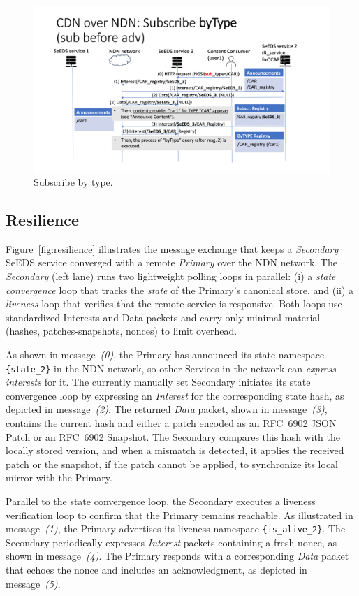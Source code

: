 \documentclass{article}
\begin{document}
\begin{figure}[H]
    \centering
    \includegraphics[width=0.8\linewidth]{images/subscribe_by_type.png}
    \caption{Subscribe by type.}
    \label{fig:subscribe_by_type}
\end{figure}

\pagebreak 

\subsection{Resilience}

Figure~\ref{fig:resilience} illustrates the message exchange that keeps a \emph{Secondary} SeEDS service converged with a remote \emph{Primary} over the NDN network. The \emph{Secondary} (left lane) runs two lightweight polling loops in parallel: (i) a \emph{state convergence} loop that tracks the \textit{state} of the Primary’s canonical store, and (ii) a \emph{liveness} loop that verifies that the remote service is responsive. Both loops use standardized Interests and Data packets and carry only minimal material (hashes, patches-snapshots, nonces) to limit overhead.

As shown in message~\emph{(0)}, the Primary has announced its state namespace \texttt{\{state\_2\}} in the NDN network, so other Services in the network can \emph{express interests} for it. The currently manually set Secondary initiates its state convergence loop by expressing an \emph{Interest} for the corresponding state hash, as depicted in message~\emph{(2)}. The returned \emph{Data} packet, shown in message~\emph{(3)}, contains the current hash and either a patch encoded as an RFC~6902 JSON Patch or an RFC~6902 Snapshot. The Secondary compares this hash with the locally stored version, and when a mismatch is detected, it applies the received patch or the snapshot, if the patch cannot be applied, to synchronize its local mirror with the Primary. 

Parallel to the state convergence loop, the Secondary executes a liveness verification loop to confirm that the Primary remains reachable. As illustrated in message~\emph{(1)}, the Primary advertises its liveness namespace \texttt{\{is\_alive\_2\}}. The Secondary periodically expresses \emph{Interest} packets containing a fresh nonce, as shown in message~\emph{(4)}. The Primary responds with a corresponding \emph{Data} packet that echoes the nonce and includes an acknowledgment, as depicted in message~\emph{(5)}. 
\end{document}
